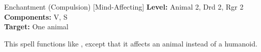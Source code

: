 {Enchantment (Compulsion) [Mind-Affecting]}
{
	\textbf{Level:}
	Animal 2, Drd 2, Rgr 2\\
	\textbf{Components:}
	V, S\\
	\textbf{Target:}
	One animal\\
}
{
	This spell functions like , except that it affects an animal instead of a humanoid.

}
